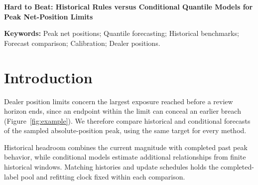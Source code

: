 \documentclass[11pt,a4paper]{article}
\begin{document}
\begin{center}\Large\bfseries Hard to Beat: Historical Rules versus Conditional Quantile Models for Peak Net-Position Limits\end{center}

\begin{abstract}Dealers monitor the largest absolute position reached before a review horizon ends. We compare conditional quantile models with historical rules on hourly FX positions, weekly New York Fed positions and CFTC dealer positions, matching histories and update schedules. Historical rules are hard to beat. First, FX regression lowers matched loss by 14.8\% and 16.6\% in two periods, but its ranking against a shorter rolling rule changes. Second, in the initial weekly comparisons, historical rules beat regression in 34 of 48 New York Fed and 29 of 34 CFTC cases. Longer validation improves regression medians in both reporting systems; CFTC short-history excess falls from 19.3\% to 4.0\%. A benchmark-default gate retains FX gains and improves weekly median performance, but leaves large individual losses. Third, lower scores need not mean lower limit costs: higher reserve charges and lower fixed breach charges generally favor regression in CFTC. Costs are illustrative, and the evidence is retrospective; the original FX evaluation period had been inspected beforehand.\end{abstract}

\noindent\textbf{Keywords:} Peak net positions; Quantile forecasting; Historical benchmarks; Forecast comparison; Calibration; Dealer positions.\par\medskip

\section{Introduction}\label{sec:intro}

Dealer position limits concern the largest exposure reached before a review horizon ends, since an endpoint within the limit can conceal an earlier breach (Figure~\ref{fig:example}). We therefore compare historical and conditional forecasts of the sampled absolute-position peak, using the same target for every method.

Historical headroom combines the current magnitude with completed past peak behavior, while conditional models estimate additional relationships from finite historical windows. Matching histories and update schedules holds the completed-label pool and refitting clock fixed within each comparison.
\end{document}
